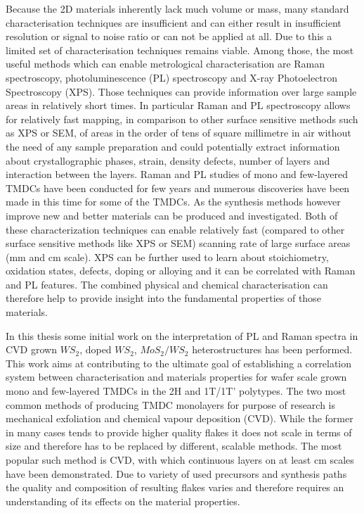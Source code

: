 Because the 2D materials inherently lack much volume or mass, many standard characterisation techniques are insufficient and can either result in insufficient resolution or signal to noise ratio or can not be applied at all. Due to this a limited set of characterisation techniques remains viable. Among those, the most useful methods which can enable metrological characterisation are Raman spectroscopy, photoluminescence (PL) spectroscopy and X-ray Photoelectron Spectroscopy (XPS). Those techniques can provide information over large sample areas in relatively short times. In particular Raman and PL spectroscopy allows for relatively fast mapping, in comparison to other surface sensitive methods such as XPS or SEM, of areas in the order of tens of square millimetre in air without the need of any sample preparation and could potentially extract information about crystallographic phases, strain, density defects, number of layers and interaction between the layers. Raman and PL studies of mono and few-layered TMDCs have been conducted for few years and numerous discoveries have been made in this time for some of the TMDCs. As the synthesis methods however improve new and better materials can be produced and investigated. Both of these characterization techniques can enable relatively fast (compared to other surface sensitive methods like XPS or SEM) scanning rate of large surface areas (mm and cm scale). XPS can be further used to learn about stoichiometry, oxidation states, defects, doping or alloying and it can be correlated with Raman and PL features. The combined physical and chemical characterisation can therefore help to provide insight into the fundamental properties of those materials.

In this thesis some initial work on the interpretation of PL and Raman spectra in CVD grown $WS_2$, doped $WS_2$, $MoS_2/WS_2$ heterostructures has been performed. This work aims at contributing to the ultimate goal of establishing a correlation system between characterisation and materials properties for wafer scale grown mono and few-layered TMDCs in the 2H and 1T/1T’ polytypes. The two most common methods of producing TMDC monolayers for purpose of research is mechanical exfoliation and chemical vapour deposition (CVD). While the former in many cases tends to provide higher quality flakes it does not scale in terms of size and therefore has to be replaced by different, scalable methods. The most popular such method is CVD, with which continuous layers on at least cm scales have been demonstrated. Due to variety of used precursors and synthesis paths the quality and composition of resulting flakes varies and therefore requires an understanding of its effects on the material properties. 


